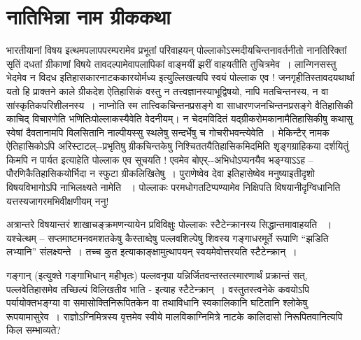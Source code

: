 \section*{नातिभिन्ना नाम ग्रीककथा}

भारतीयानां विषय इत्थमपलापपरम्परामेव प्रभूतां परिवाहयन् पोल्लाकोऽस्मदीयचिन्तनावर्तनीतो नानतिरिक्तां सृतिं दधतां ग्रीकाणां विषये तावदल्पामेवापलापिकां वाङ्मयीं झरीं वाहयतीति तु\break चित्रमेव~। लान्गिनसस्तु  भेदमेव न विदध इतिहासकारनाटककारयोर्मध्य इत्युल्लिखत्यपि स्वयं पोल्लाक एव ! जनगृहीतिस्तावदयथार्था यतो हि प्राक्तने काले ग्रीकदेश ऐतिहासिकं वस्तु न तत्त्वज्ञानस्याभूद्विषयो, नापि मतचिन्तनस्य, न वा सांस्कृतिकपरिशीलनस्य~। नाप्नोति स्म तात्त्विकचिन्तनप्रसङ्गे वा साधारणजनचिन्तनप्रसङ्गे वैतिहासिकी काचिद् विचारणेति भणितिःपोल्लाकस्यैवेति वेदनीयम्। न चेदमविदितं यद्ग्रीकरोमकानामैतिहासिकीषु कथासु स्वेषां दैवतानामपि विलसितानि नाल्पीयस्सु स्थलेषु सन्दर्भेषु च गोचरीभवन्त्येवेति~। मेकिन्टैर् नामक ऐतिहासिकोऽपि अरिस्टाटल्--प्रभृतिषु ग्रीकचिन्तकेषु निश्चिततयैतिहासिकमिदमिति शृङ्गग्राहिकया दर्शयितुं किमपि न पार्यत इत्याहेति पोल्लाक एव सूचयति ! एवमेव बोएर्--अभिधोऽप्यनयैव भङ्ग्याऽऽह – पौरणिकैतिहासिकयोर्भिदा न स्फुटा ग्रीकलिखितेषु~। पुराणेष्वेव देवा इतिहासेष्वेव मनुष्या\break इतीदृशो विषयविभागोऽपि नाभिलक्ष्यते नामेति ~। पोल्लाकः परमधोगतटिप्पण्यामेव निक्षिपति विषयानीदृग्विधानिति यत्तस्यजागरमभिवीक्षणीयम् ननु!

अत्रान्तरे विषयान्तरं शाखाचङ्क्रमणन्यायेन प्रविविक्षुः पोल्लाकः स्टैटेन्क्रानस्य  सिद्धान्तमावाहयति ~। यश्चेत्थम् – सप्तमाष्टमनवमशतकेषु कैस्ताब्देषु पल्लवशिल्पेषु शिवस्य गङ्गाधरमूर्ते रूपाणि “झडिति लभ्यानि” संलक्ष्यन्ते~। तच्च कुत इत्याकाङ्क्षामुत्थापयन् स्वयमेवोत्तरयति स्टैटेन्क्रान्~।

गङ्गान् (इत्युक्ते गङ्गाभिधान् महीभृतः) पल्लवनृपा यन्निर्जितवन्तस्तत्स्मारणार्थं प्रक्रान्तं सत्, पल्लवेतिहासमेव तच्छिल्पं विलिखतीव भाति - इत्याह स्टैटेन्क्रान्~। वस्तुतस्त्वनेके कवयोऽपि पर्यायोक्तभङ्ग्या वा समासोक्तिनिरूपितकेन वा तथाविधानि स्वकालिकानि घटितानि श्लोकेषु रूपयामासुरेव~। राज्ञोऽग्निमित्रस्य वृत्तमेव स्वीये मालविकाग्निमित्रे नाटके कालिदासो निरूपितवानित्यपि किल सम्भाव्यते?

